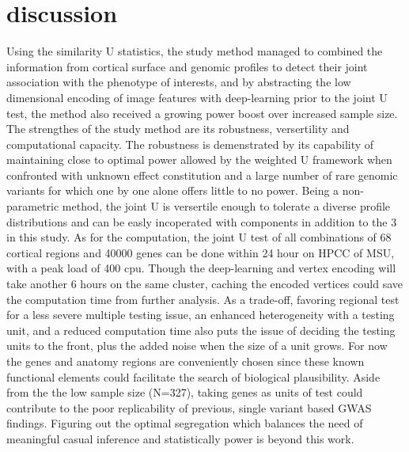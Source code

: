 \documentclass[twocolumn]{article}
\begin{document}
\section{discussion}
Using the similarity U statistics, the study method managed to combined the information from cortical surface and genomic profiles to detect their joint association with the phenotype of interests, and by abstracting the low dimensional encoding of image features with deep-learning prior to the joint U test, the method also received a growing power boost over increased sample size. The strengthes of the study method are its robustness, versertility and computational capacity. The robustness is demenstrated by its capability of maintaining close to optimal power allowed by the weighted U framework when confronted with unknown effect constitution and a large number of rare genomic variants for which one by one alone offers little to no power. Being a non-parametric method, the joint U is versertile enough to tolerate a diverse profile distributions and can be easly incoperated with components in addition to the 3 in this study. As for the computation, the joint U test of all combinations of 68 cortical regions and 40000 genes can be done within 24 hour on HPCC of MSU, with a peak load of 400 cpu. Though the deep-learning and vertex encoding will take another 6 hours on the same cluster, caching the encoded vertices could save the computation time from further analysis. 
As a trade-off, favoring regional test for a less severe multiple testing issue, an enhanced heterogeneity with a testing unit, and a reduced computation time also puts the issue of deciding the testing units to the front, plus the added noise when the size of a unit grows. For now the genes and anatomy regions are conveniently chosen since these known functional elements could facilitate the search of biological plausibility. Aside from the the low sample size (N=327), taking genes as units of test could contribute to the poor replicability of previous, single variant based GWAS findings. Figuring out the optimal segregation which balances the need of meaningful casual inference and statistically power is beyond this work.


\end{document}
